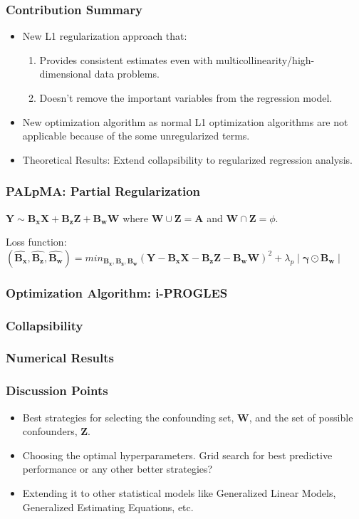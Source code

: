 \documentclass{beamer}
\begin{document}
\begin{frame}
	\frametitle{Contribution Summary}
	\begin{itemize}
		\item New L1 regularization approach that:
			\begin{enumerate}
				\item Provides consistent estimates even with
					multicollinearity/high-dimensional data
					problems.
				\item Doesn't remove the important variables
					from the regression model.
			\end{enumerate}
		\item New optimization algorithm as normal L1 optimization algorithms are not applicable because of the some unregularized terms.
		\item Theoretical Results: Extend collapsibility to regularized regression analysis.
	\end{itemize}
\end{frame}

\begin{frame}
	\frametitle{PALpMA: Partial Regularization}
	$ \bm{Y} \sim \bm{B_x X} + \bm{B_z Z} + \bm{B_w W} $ where $ \bm{W} \cup \bm{Z} = \bm{A} $ and $ \bm{W} \cap \bm{Z} = \phi $.
	
	Loss function: $ (\bm{\hat{B_x}}, \bm{\hat{B_z}}, \bm{\hat{B_w}}) = min_{\bm{B_x}, \bm{B_z}, \bm{B_w}} (\bm{Y} - \bm{B_x X} - \bm{B_z Z} - \bm{B_w W})^2 + \lambda_p \mid \bm{\gamma} \odot \bm{B_w} \mid $

\end{frame}

\begin{frame}
	\frametitle{Optimization Algorithm: i-PROGLES}
\end{frame}

\begin{frame}
	\frametitle{Collapsibility}
\end{frame}

\begin{frame}
	\frametitle{Numerical Results}
\end{frame}

\begin{frame}
	\frametitle{Discussion Points}
	\begin{itemize}
		\item Best strategies for selecting the confounding set, $
			\bm{W} $, and the set of possible confounders, $ \bm{Z} $.
		\item Choosing the optimal hyperparameters. Grid search for best 
			predictive performance or any other better strategies?
		\item Extending it to other statistical models like Generalized
			Linear Models, Generalized Estimating Equations, etc.
	\end{itemize}
\end{frame}
\end{document}
